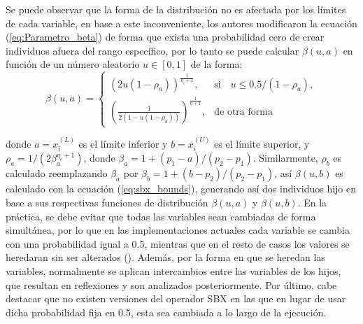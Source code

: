 Se puede observar que la forma de la distribución no es afectada por los límites de cada variable, en base a este inconveniente, los autores \cite{deb1999self} modificaron la ecuación (\ref{eq:Parametro_beta}) de forma que exista una probabilidad cero de crear individuos afuera del rango específico, por lo tanto se puede calcular $\beta(u, a)$ en función de un número aleatorio $u \in [0,1]$ de la forma:
\begin{equation} \label{eq:sbx_bounds}
    \beta(u, a)= 
\begin{cases}
     (2u(1-\rho_a))^{\frac{1}{\eta_c+1}},& \text{si} \quad u \leq 0.5/(1-\rho_a),\\
     	(\frac{1}{2(1-u(1-\rho_a))})^{\frac{1}{\eta+1}} ,& \text{de otra forma}
\end{cases}
\end{equation}

donde $a=x_i^{(L)}$ es el límite inferior y $b=x_i^{(U)}$ es el límite superior, y $\rho_a = 1/(2 \beta_a^{\eta_c+1})$, donde $\beta_a = 1 +(p_1 - a)/(p_2 - p_1)$.
%
Similarmente, $\rho_b$ es calculado reemplazando $\beta_a$ por $\beta_b =  1 + (b - p_2)/(p_2 - p_1)$, así $\beta(u, b)$ es calculado con la ecuación (\ref{eq:sbx_bounds}), generando así dos individuos hijo en base a sus respectivas funciones de distribución $\beta(u,a)$ y $\beta(u,b)$.
%
En la práctica, se debe evitar que todas las variables sean cambiadas de forma simultánea, por lo que en las implementaciones actuales cada variable se cambia con una probabilidad igual a 0.5, mientras que en el resto de casos los valores se heredaran sin ser alterados (\cite{Joel:NSGAII,Joel:jMetal}).
%
Además, por la forma en que se heredan las variables, normalmente se aplican intercambios entre las variables de los hijos, que resultan en reflexiones y son analizados posteriormente.
%
Por último, cabe destacar que no existen versiones del operador SBX en las que en lugar de usar dicha probabilidad fija en 0.5, esta sea cambiada a lo largo de la ejecución.

